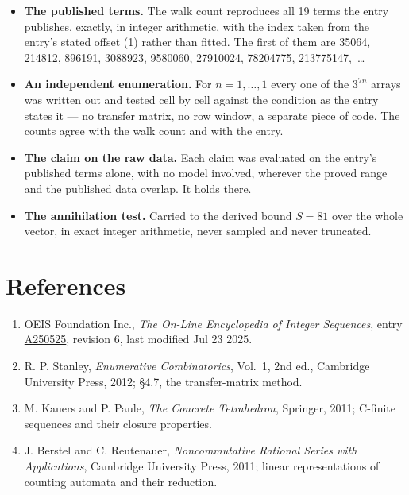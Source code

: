 \documentclass[11pt]{article}
\theoremstyle{definition}
\begin{document}
\begin{itemize}

\item {\bfseries The published terms.} The walk count reproduces all 19 terms the entry publishes, exactly, in integer arithmetic, with the index taken from the entry's stated offset (1) rather than fitted. The first of them are 35064, 214812, 896191, 3088923, 9580060, 27910024, 78204775, 213775147,~\dots

\item {\bfseries An independent enumeration.} For $n = 1,\dots,1$ every one of the $3^{7n}$ arrays was written out and tested cell by cell against the condition as the entry states it --- no transfer matrix, no row window, a separate piece of code. The counts agree with the walk count and with the entry.

\item {\bfseries The claim on the raw data.} Each claim was evaluated on the entry's published terms alone, with no model involved, wherever the proved range and the published data overlap. It holds there.

\item {\bfseries The annihilation test.} Carried to the derived bound $S = 81$ over the whole vector, in exact integer arithmetic, never sampled and never truncated.

\end{itemize}

\section{References}

\begin{enumerate}

\item OEIS Foundation Inc., \emph{The On-Line Encyclopedia of Integer Sequences}, entry \href{https://oeis.org/A250525}{A250525}, revision 6, last modified Jul 23 2025.

\item R. P. Stanley, \emph{Enumerative Combinatorics}, Vol.~1, 2nd ed., Cambridge University Press, 2012; \S4.7, the transfer-matrix method.

\item M. Kauers and P. Paule, \emph{The Concrete Tetrahedron}, Springer, 2011; C-finite sequences and their closure properties.

\item J. Berstel and C. Reutenauer, \emph{Noncommutative Rational Series with Applications}, Cambridge University Press, 2011; linear representations of counting automata and their reduction.

\end{enumerate}
\end{document}
